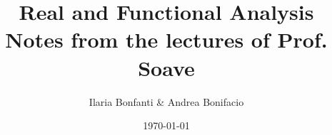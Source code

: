 \documentclass[a4paper,12pt]{article}
\theoremstyle{break}
\begin{document}
\title{Real and Functional Analysis \\ \small{Notes from the lectures of Prof. Soave}}
\author{Ilaria Bonfanti \& Andrea Bonifacio}
\date{\today}
\maketitle




  



















\end{document}
